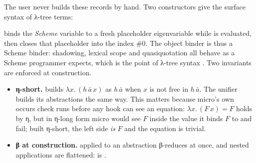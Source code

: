 The user never builds these records by hand. Two constructors give the surface syntax of λ-tree terms:
 binds the \emph{Scheme} variable  to a fresh placeholder eigenvariable while
 is evaluated, then closes that placeholder into the index \#0. The object binder is thus a Scheme
binder: shadowing, lexical scope and quasiquotation all behave as a Scheme programmer expects, which is the
point of λ-tree syntax . Two invariants are enforced at construction.
\begin{itemize}
  \item \textbf{η-short.}  builds $\lambda x.\,(h\,\bar a\,x)$ as $h\,\bar a$ when $x$ is not
    free in $h\,\bar a$. The unifier builds its abstractions the same way. This matters because micro's own
    occurs check runs before any hook can see an equation: $\lambda x.\,(F\,x) = F$ holds by η, but in
    η-long form micro would see $F$ inside the value it binds $F$ to and fail; built η-short, the left side
    \emph{is} $F$ and the equation is trivial.
  \item \textbf{β at construction.}  applied to an abstraction β-reduces at once, and nested
    applications are flattened:  is .
\end{itemize}

